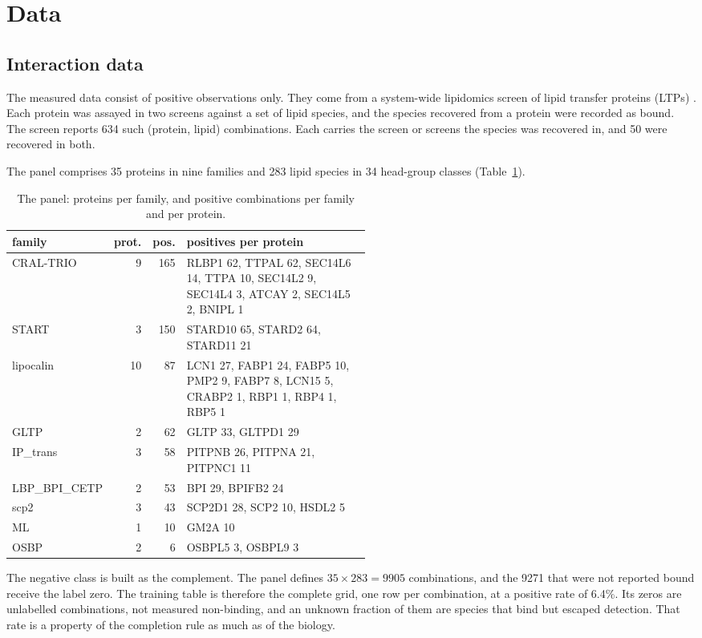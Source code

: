 \section{Data}

\subsection{Interaction data}

The measured data consist of positive observations only. They come from a system-wide lipidomics
screen of lipid transfer proteins (LTPs) \cite{acg}. Each protein was assayed in two screens
against a set of lipid species, and the species recovered from a protein were recorded as bound.
The screen reports 634 such (protein, lipid) combinations. Each carries the screen or screens the
species was recovered in, and 50 were recovered in both.

The panel comprises 35 proteins in nine families and 283 lipid species in 34 head-group classes
(Table~\ref{tab:families}).

\begin{table}[htbp]
\centering
\begin{tabular}{lrrp{0.52\linewidth}}
\hline
family & prot. & pos. & positives per protein \\
\hline
CRAL-TRIO & 9 & 165 & RLBP1 62, TTPAL 62, SEC14L6 14, TTPA 10, SEC14L2 9, SEC14L4 3, ATCAY 2, SEC14L5 2, BNIPL 1 \\
START & 3 & 150 & STARD10 65, STARD2 64, STARD11 21 \\
lipocalin & 10 & 87 & LCN1 27, FABP1 24, FABP5 10, PMP2 9, FABP7 8, LCN15 5, CRABP2 1, RBP1 1, RBP4 1, RBP5 1 \\
GLTP & 2 & 62 & GLTP 33, GLTPD1 29 \\
IP\_trans & 3 & 58 & PITPNB 26, PITPNA 21, PITPNC1 11 \\
LBP\_BPI\_CETP & 2 & 53 & BPI 29, BPIFB2 24 \\
scp2 & 3 & 43 & SCP2D1 28, SCP2 10, HSDL2 5 \\
ML & 1 & 10 & GM2A 10 \\
OSBP & 2 & 6 & OSBPL5 3, OSBPL9 3 \\
\hline
\end{tabular}
\caption{The panel: proteins per family, and positive combinations per family and per protein.}
\label{tab:families}
\end{table}

The negative class is built as the complement. The panel defines $35 \times 283 = 9905$
combinations, and the 9271 that were not reported bound receive the label zero. The training
table is therefore the complete grid, one row per combination, at a positive rate of 6.4\%. Its
zeros are unlabelled combinations, not measured non-binding, and an unknown fraction of them are
species that bind but escaped detection. That rate is a property of the completion rule as much as
of the biology.

